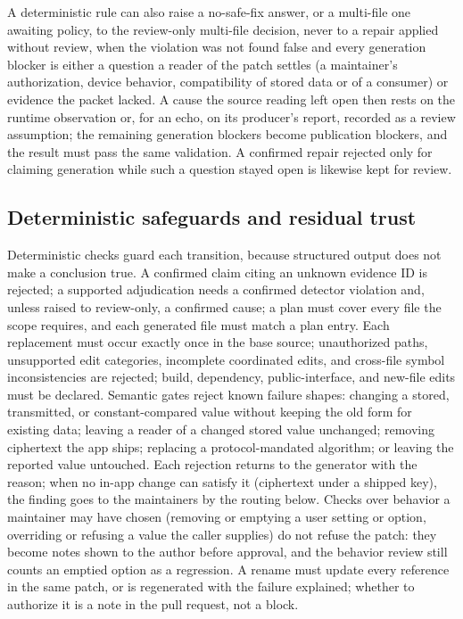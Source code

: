 \documentclass[conference]{IEEEtran}
\begin{document}
A deterministic rule can also raise a no-safe-fix answer, or a multi-file one
awaiting policy, to the review-only multi-file decision, never to a repair
applied without review, when the violation was not found false and every
generation blocker is either a question a reader of the patch settles (a
maintainer's authorization, device behavior, compatibility of stored data or
of a consumer) or evidence the packet lacked. A cause the source reading left
open then rests on the runtime observation or, for an echo, on its producer's
report, recorded as a review assumption; the remaining generation blockers
become publication blockers, and the result must pass the same validation. A
confirmed repair rejected only for claiming generation while such a question
stayed open is likewise kept for review.

\subsection{Deterministic safeguards and residual trust}

Deterministic checks guard each transition, because structured output does not
make a conclusion true. A confirmed claim citing an unknown evidence ID is
rejected; a supported adjudication needs a confirmed detector violation and,
unless raised to review-only, a confirmed cause; a plan must cover every file the scope requires, and each generated
file must match a plan entry. Each replacement must occur exactly once in the
base source; unauthorized paths, unsupported edit categories, incomplete
coordinated edits, and cross-file symbol inconsistencies are rejected; build,
dependency, public-interface, and new-file edits must be declared.
Semantic gates reject known failure shapes: changing a stored, transmitted, or
constant-compared value without keeping the old form for existing data; leaving
a reader of a changed stored value unchanged; removing ciphertext the app
ships; replacing a protocol-mandated algorithm; or leaving the reported value
untouched. Each rejection returns to the generator with the reason; when no
in-app change can satisfy it (ciphertext under a shipped key), the finding goes
to the maintainers by the routing below. Checks over behavior a maintainer may
have chosen (removing or emptying a user setting or option, overriding or
refusing a value the caller supplies) do not refuse the patch: they become
notes shown to the author before approval, and the behavior review still
counts an emptied option as a regression. A rename must update every reference
in the same patch, or is regenerated with the failure explained; whether to
authorize it is a note in the pull request, not a block.
\end{document}
